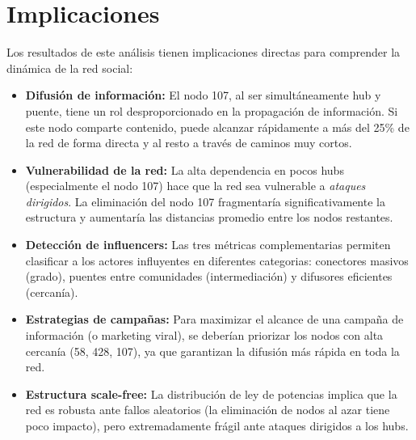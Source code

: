 \documentclass[12pt,a4paper,oneside,openany]{book}
\begin{document}
\section{Implicaciones}

\begin{infobox}
Los resultados de este análisis tienen implicaciones directas para comprender la
dinámica de la red social:

\begin{itemize}[leftmargin=0.8cm]
  \item \textbf{Difusión de información:} El nodo 107, al ser simultáneamente hub y
    puente, tiene un rol desproporcionado en la propagación de información. Si este
    nodo comparte contenido, puede alcanzar rápidamente a más del 25\% de la red
    de forma directa y al resto a través de caminos muy cortos.

  \item \textbf{Vulnerabilidad de la red:} La alta dependencia en pocos hubs (especialmente
    el nodo 107) hace que la red sea vulnerable a \textit{ataques dirigidos}. La eliminación
    del nodo 107 fragmentaría significativamente la estructura y aumentaría las distancias
    promedio entre los nodos restantes.

  \item \textbf{Detección de influencers:} Las tres métricas complementarias permiten
    clasificar a los actores influyentes en diferentes categorias: conectores masivos
    (grado), puentes entre comunidades (intermediación) y difusores eficientes (cercanía).

  \item \textbf{Estrategias de campañas:} Para maximizar el alcance de una campaña de
    información (o marketing viral), se deberían priorizar los nodos con alta cercanía
    (58, 428, 107), ya que garantizan la difusión más rápida en toda la red.

  \item \textbf{Estructura scale-free:} La distribución de ley de potencias implica que
    la red es robusta ante fallos aleatorios (la eliminación de nodos al azar tiene
    poco impacto), pero extremadamente frágil ante ataques dirigidos a los hubs.
\end{itemize}
\end{infobox}
\end{document}
